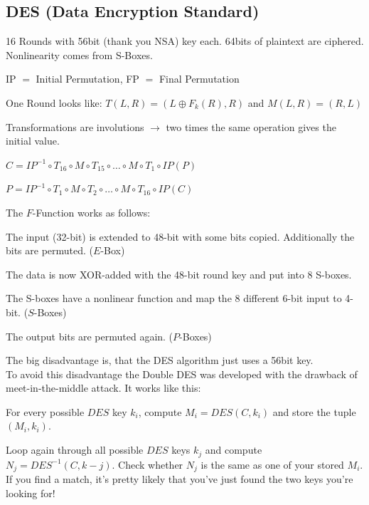 \subsection{DES (Data Encryption Standard)}
\begin{minipage}{10cm}
\begin{liste}
\item 16 Rounds with 56bit (thank you NSA) key each. 64bits of plaintext are ciphered. Nonlinearity comes from S-Boxes.
\item IP $=$ Initial Permutation, FP $=$ Final Permutation
\item One Round looks like: $T(L,R)=(L \oplus F_k(R),R)$ and $M(L,R)=(R,L)$
\item Transformations are involutions $\to$ two times the same operation gives the initial value.
\item $C=IP^{-1} \circ T_{16} \circ M \circ T_{15} \circ \ldots \circ M \circ T_1 \circ IP(P)$
\item $P=IP^{-1} \circ T_1 \circ  M \circ T_2 \circ \ldots \circ M \circ T_{16} \circ IP(C)$
\end{liste}
The $F$-Function works as follows:
\begin{liste}
\item The input (32-bit) is extended to 48-bit with some bits copied. Additionally the bits are permuted. ($E$-Box)
\item The data is now XOR-added with the 48-bit round key and put into 8 S-boxes.
\item The S-boxes have a nonlinear function and map the 8 different 6-bit input to 4-bit. ($S$-Boxes)
\item The output bits are permuted again. ($P$-Boxes)
\end{liste}
The big disadvantage is, that the DES algorithm just uses a 56bit key.\\
To avoid this disadvantage the Double DES was developed with the drawback of meet-in-the-middle attack. It works like this:
\begin{aufzaehlung}
    \item For every possible $DES$ key $k_i$, compute $M_i = DES(C,k_i)$ and store the tuple $(M_i, k_i)$.\\
    \item Loop again through all possible $DES$ keys $k_j$ and compute $N_j = DES^{-1}(C,k-j)$. Check whether $N_j$ 
    is the same as one of your stored $M_i$. If you find a match, it's pretty likely that you've just 
    found the two keys you're looking for!\\

\end{aufzaehlung}
\end{minipage}
